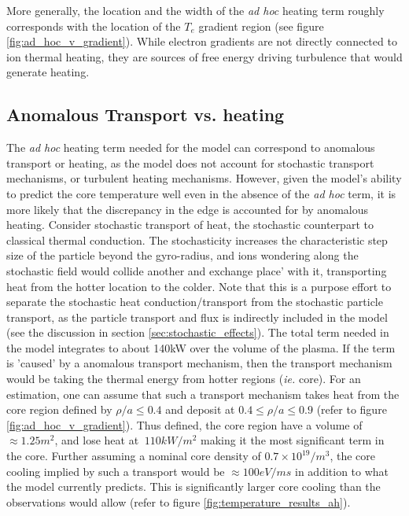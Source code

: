 More generally, the location and the width of the \textit{ad hoc} heating term roughly corresponds with the location of the $T_e$ gradient region (see figure \ref{fig:ad_hoc_v_gradient}). While electron gradients are not directly connected to ion thermal heating, they are sources of free energy driving turbulence that would generate heating. 

\subsection{Anomalous Transport vs. heating}

The \textit{ad hoc} heating term needed for the model can correspond to anomalous transport or heating, as the model does not account for stochastic transport mechanisms, or turbulent heating mechanisms. However, given the model's ability to predict the core temperature well even in the absence of the \textit{ad hoc} term, it is more likely that the discrepancy in the edge is accounted for by anomalous heating. 
Consider stochastic transport of heat, the stochastic counterpart to classical thermal conduction. The stochasticity increases the characteristic step size of the particle beyond the gyro-radius, and ions wondering along the stochastic field would collide another and exchange place' with it, transporting heat from the hotter location to the colder. Note that this is a purpose effort to separate the stochastic heat conduction/transport from the stochastic particle transport, as the particle transport and flux is indirectly included in the model (see the discussion in section \ref{sec:stochastic_effects}). The total \adhoc term needed in the model integrates to about 140kW over the volume of the plasma. If the \adhoc term is 'caused' by a anomalous transport mechanism, then the transport mechanism would be taking the thermal energy from hotter regions (\textit{ie.} core). For an estimation, one can assume that such a transport mechanism takes heat from the core region defined by $\rho/a \leq 0.4$ and deposit at $0.4 \leq \rho/a \leq 0.9$ (refer to figure \ref{fig:ad_hoc_v_gradient}). Thus defined, the core region have a volume of $\approx 1.25 m^2$, and lose heat at $~110kW/m^2$ making it the most significant term in the core. Further assuming a nominal core density of $0.7 \times 10^{19}/m^3$, the core cooling implied by such a transport would be $\approx 100eV/ms$ in addition to what the model currently predicts. This is significantly larger core cooling than the observations would allow (refer to figure \ref{fig:temperature_results_ah}).

